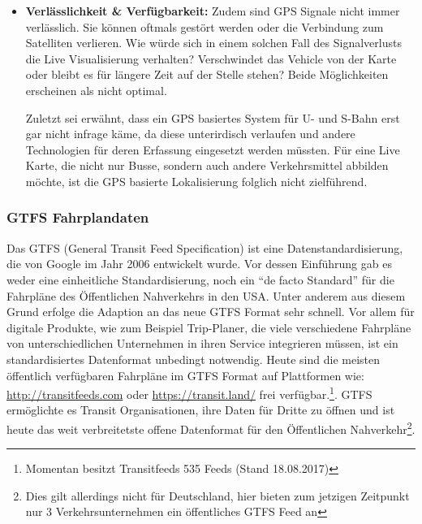 \begin{itemize}[label={}]
      \item \textbf{Verlässlichkeit \& Verfügbarkeit:} 
        Zudem sind GPS Signale nicht immer verlässlich. Sie können oftmals gestört werden oder die Verbindung zum Satelliten verlieren. Wie würde sich in einem solchen Fall des Signalverlusts die Live Visualisierung verhalten? Verschwindet das Vehicle von der Karte oder bleibt es für längere Zeit auf der Stelle stehen? Beide Möglichkeiten erscheinen als nicht optimal. 

        Zuletzt sei erwähnt, dass ein GPS basiertes System für U- und S-Bahn erst gar nicht infrage käme, da diese unterirdisch verlaufen und andere Technologien für deren Erfassung eingesetzt werden müssten. Für eine Live Karte, die nicht nur Busse, sondern auch andere Verkehrsmittel abbilden möchte, ist die GPS basierte Lokalisierung folglich nicht zielführend. 

    \end{itemize} 


    \subsubsection{GTFS Fahrplandaten}
    \label{ssub:gtfs_fahrplandaten}
      Das GTFS (General Transit Feed Specification) ist eine Datenstandardisierung, die von Google im Jahr 2006 entwickelt wurde. Vor dessen Einführung gab es weder eine einheitliche Standardisierung, noch ein "`de facto Standard"' für die Fahrpläne des Öffentlichen Nahverkehrs in den USA. Unter anderem aus diesem Grund erfolge die Adaption an das neue GTFS Format sehr schnell. Vor allem für digitale Produkte, wie zum Beispiel Trip-Planer, die viele verschiedene Fahrpläne von unterschiedlichen Unternehmen in ihren Service integrieren müssen, ist ein standardisiertes Datenformat unbedingt notwendig. Heute sind die meisten öffentlich verfügbaren Fahrpläne im GTFS Format auf Plattformen wie: \url{http://transitfeeds.com} oder \url{https://transit.land/} frei verfügbar.\footnote{Momentan besitzt Transitfeeds 535 Feeds (Stand 18.08.2017)}. GTFS ermöglichte es Transit Organisationen, ihre Daten für Dritte zu öffnen und ist heute das weit verbreitetste offene Datenformat für den Öffentlichen Nahverkehr\footnote{Dies gilt allerdings nicht für Deutschland, hier bieten zum jetzigen Zeitpunkt nur 3 Verkehrsunternehmen ein öffentliches GTFS Feed an}.\parencite[S. 2]{roush}\\

